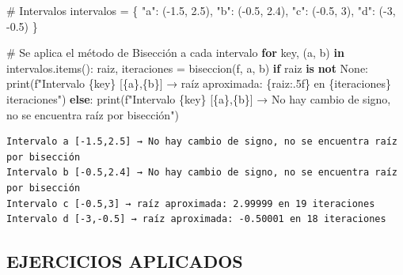 \documentclass[
  english,
  letterpaper,
  DIV=11,
  numbers=noendperiod]{scrartcl}
\newenvironment{Shaded}{\begin{snugshade}}{\end{snugshade}}
\newcommand{\BuiltInTok}[1]{\textcolor[rgb]{0.00,0.23,0.31}{#1}}
\newcommand{\CommentTok}[1]{\textcolor[rgb]{0.37,0.37,0.37}{#1}}
\newcommand{\ControlFlowTok}[1]{\textcolor[rgb]{0.00,0.23,0.31}{\textbf{#1}}}
\newcommand{\DecValTok}[1]{\textcolor[rgb]{0.68,0.00,0.00}{#1}}
\newcommand{\FloatTok}[1]{\textcolor[rgb]{0.68,0.00,0.00}{#1}}
\newcommand{\KeywordTok}[1]{\textcolor[rgb]{0.00,0.23,0.31}{\textbf{#1}}}
\newcommand{\NormalTok}[1]{\textcolor[rgb]{0.00,0.23,0.31}{#1}}
\newcommand{\OperatorTok}[1]{\textcolor[rgb]{0.37,0.37,0.37}{#1}}
\newcommand{\SpecialCharTok}[1]{\textcolor[rgb]{0.37,0.37,0.37}{#1}}
\newcommand{\SpecialStringTok}[1]{\textcolor[rgb]{0.13,0.47,0.30}{#1}}
\newcommand{\StringTok}[1]{\textcolor[rgb]{0.13,0.47,0.30}{#1}}
\newcommand{\VariableTok}[1]{\textcolor[rgb]{0.07,0.07,0.07}{#1}}
\begin{document}
\begin{Shaded}
\begin{Highlighting}[]
\CommentTok{\# Intervalos}
\NormalTok{intervalos }\OperatorTok{=}\NormalTok{ \{}
    \StringTok{"a"}\NormalTok{: (}\OperatorTok{{-}}\FloatTok{1.5}\NormalTok{, }\FloatTok{2.5}\NormalTok{),}
    \StringTok{"b"}\NormalTok{: (}\OperatorTok{{-}}\FloatTok{0.5}\NormalTok{, }\FloatTok{2.4}\NormalTok{),}
    \StringTok{"c"}\NormalTok{: (}\OperatorTok{{-}}\FloatTok{0.5}\NormalTok{, }\DecValTok{3}\NormalTok{),}
    \StringTok{"d"}\NormalTok{: (}\OperatorTok{{-}}\DecValTok{3}\NormalTok{, }\OperatorTok{{-}}\FloatTok{0.5}\NormalTok{)}
\NormalTok{\}}

\CommentTok{\# Se aplica el método de Bisección a cada intervalo}
\ControlFlowTok{for}\NormalTok{ key, (a, b) }\KeywordTok{in}\NormalTok{ intervalos.items():}
\NormalTok{    raiz, iteraciones }\OperatorTok{=}\NormalTok{ biseccion(f, a, b)}
    \ControlFlowTok{if}\NormalTok{ raiz }\KeywordTok{is} \KeywordTok{not} \VariableTok{None}\NormalTok{:}
        \BuiltInTok{print}\NormalTok{(}\SpecialStringTok{f"Intervalo }\SpecialCharTok{\{}\NormalTok{key}\SpecialCharTok{\}}\SpecialStringTok{ [}\SpecialCharTok{\{}\NormalTok{a}\SpecialCharTok{\}}\SpecialStringTok{,}\SpecialCharTok{\{}\NormalTok{b}\SpecialCharTok{\}}\SpecialStringTok{] → raíz aproximada: }\SpecialCharTok{\{}\NormalTok{raiz}\SpecialCharTok{:.5f\}}\SpecialStringTok{ en }\SpecialCharTok{\{}\NormalTok{iteraciones}\SpecialCharTok{\}}\SpecialStringTok{ iteraciones"}\NormalTok{)}
    \ControlFlowTok{else}\NormalTok{:}
        \BuiltInTok{print}\NormalTok{(}\SpecialStringTok{f"Intervalo }\SpecialCharTok{\{}\NormalTok{key}\SpecialCharTok{\}}\SpecialStringTok{ [}\SpecialCharTok{\{}\NormalTok{a}\SpecialCharTok{\}}\SpecialStringTok{,}\SpecialCharTok{\{}\NormalTok{b}\SpecialCharTok{\}}\SpecialStringTok{] → No hay cambio de signo, no se encuentra raíz por bisección"}\NormalTok{)}
\end{Highlighting}
\end{Shaded}

\begin{verbatim}
Intervalo a [-1.5,2.5] → No hay cambio de signo, no se encuentra raíz por bisección
Intervalo b [-0.5,2.4] → No hay cambio de signo, no se encuentra raíz por bisección
Intervalo c [-0.5,3] → raíz aproximada: 2.99999 en 19 iteraciones
Intervalo d [-3,-0.5] → raíz aproximada: -0.50001 en 18 iteraciones
\end{verbatim}

\subsection{EJERCICIOS APLICADOS}\label{ejercicios-aplicados}
\end{document}
